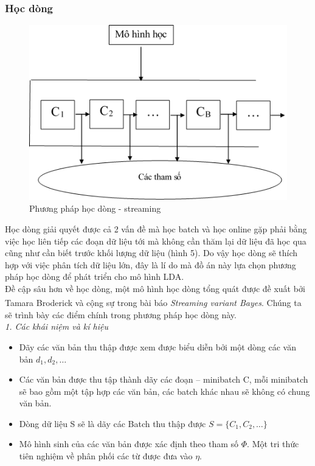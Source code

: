 \documentclass[fontsize=13pt]{scrartcl}
\begin{document}
\subsubsection{Học dòng}\label{subsec:streamingintro}
\begin{figure}[h]
\begin{center}
\includegraphics[scale=0.7]{img/streaming.png}
\end{center}
\label{fig:streamingLearning}
\caption{Phương pháp học dòng - streaming}
\end{figure}
Học dòng giải quyết được cả 2 vấn đề mà học batch và học online gặp phải bằng việc học liên tiếp các đoạn dữ liệu tới mà không cần thăm lại dữ liệu đã học qua cũng như cần biết trước khối lượng dữ liệu (hình 5). Do vậy học dòng sẽ thích hợp với việc phân tích dữ liệu lớn, đây là lí do mà đồ án này lựa chọn phương pháp học dòng để phát triển cho mô hình LDA.\\
Đề cập sâu hơn về học dòng, một mô hình học dòng tổng quát được đề xuất bởi Tamara Broderick và cộng sự trong bài báo \textit{Streaming variant Bayes}\textsuperscript{\cite{streamvb}}. Chúng ta sẽ trình bày các điểm chính trong phương pháp học dòng này.\\
\textit{1. Các khái niệm và kí hiệu}
\begin{itemize}
\item Dãy các văn bản thu thập được xem được biểu diễn bởi một dòng các văn bản $d_1, d_2, \ldots$ 
\item Các văn bản được thu tập thành dãy các đoạn – minibatch C, mỗi minibatch sẽ bao gồm một tập hợp các văn bản, các batch khác nhau sẽ không có chung văn bản.  
\item Dòng dữ liệu S sẽ là dãy các Batch thu thập được $S = \{ C_1, C_2, \ldots \}$
\item Mô hình sinh của các văn bản được xác định theo tham số $\Phi$. Một tri thức tiên nghiệm về phân phối các từ được đưa vào $\eta$.
\end{itemize}
\end{document}

